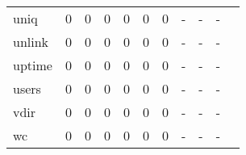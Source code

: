 \begin{longtable}{lp{1.2cm}p{1.2cm}p{1.2cm}p{1.2cm}p{1.2cm}p{1.2cm}p{1.2cm}p{1.2cm}p{1.2cm}p{1.2cm}}
uniq      &                                     0 &                                                  0 &                                                  0 &                                                  0 &                                                  0 &                                                  0 &                                             - &                                                  - &                                                  - \\
unlink    &                                     0 &                                                  0 &                                                  0 &                                                  0 &                                                  0 &                                                  0 &                                             - &                                                  - &                                                  - \\
uptime    &                                     0 &                                                  0 &                                                  0 &                                                  0 &                                                  0 &                                                  0 &                                             - &                                                  - &                                                  - \\
users     &                                     0 &                                                  0 &                                                  0 &                                                  0 &                                                  0 &                                                  0 &                                             - &                                                  - &                                                  - \\
vdir      &                                     0 &                                                  0 &                                                  0 &                                                  0 &                                                  0 &                                                  0 &                                             - &                                                  - &                                                  - \\
wc        &                                     0 &                                                  0 &                                                  0 &                                                  0 &                                                  0 &                                                  0 &                                             - &                                                  - &                                                  - \\

\end{longtable}
